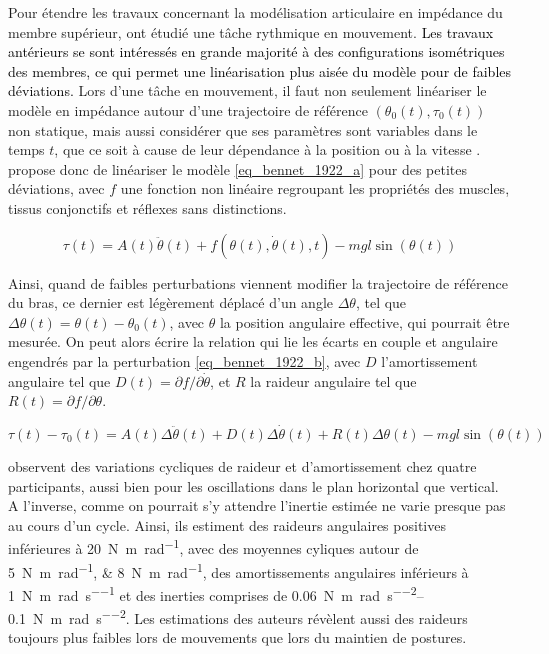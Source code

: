 Pour étendre les travaux concernant la modélisation articulaire en impédance du membre supérieur, \textcite{bennett_time-varying_1992} ont étudié une tâche rythmique en mouvement. \textcolor{black}{Les travaux antérieurs se sont intéressés en grande majorité à des configurations isométriques des membres, ce qui permet une linéarisation plus aisée du modèle pour de faibles déviations.} Lors d'une tâche en mouvement, il faut non seulement linéariser le modèle en impédance autour d'une trajectoire de référence $(\theta_0(t), \tau_0(t))$ non statique, mais aussi considérer que ses paramètres sont variables dans le temps $t$, que ce soit à cause de leur dépendance à la position ou à la vitesse \parencite{milner_dependence_1993, kuxhaus_dependence_2014}. \textcite{bennett_time-varying_1992} propose donc de linéariser le modèle \cref{eq_bennet_1922_a} pour des petites déviations, avec $f$ une fonction non linéaire regroupant les propriétés des muscles, tissus conjonctifs et réflexes sans distinctions.

\begin{equation} \label{eq_bennet_1922_a}
	\tau(t) = A(t)\ddot{\theta}(t) + f(\theta(t), \dot{\theta}(t), t) - mgl\sin(\theta(t))
\end{equation}

Ainsi, quand de faibles perturbations viennent modifier la trajectoire de référence du bras, ce dernier est légèrement déplacé d'un angle $\Delta\theta$, tel que $\Delta\theta(t) = \theta(t) - \theta_0(t)$, avec $\theta$ la position angulaire effective, qui pourrait être mesurée. On peut alors écrire la relation qui lie les écarts en couple et angulaire engendrés par la perturbation \cref{eq_bennet_1922_b}, avec $D$ l'amortissement angulaire tel que $D(t) = \partial f/\partial \dot{\theta}$, et $R$ la raideur angulaire tel que $R(t) = \partial f/\partial \theta$.

\begin{equation} \label{eq_bennet_1922_b}
	\tau(t) - \tau_0(t) = A(t)\Delta\ddot{\theta}(t) + D(t)\Delta\dot{\theta}(t) + R(t)\Delta\theta(t) - mgl\sin(\theta(t))
\end{equation}

\textcite{bennett_time-varying_1992} observent des variations cycliques de raideur et d'amortissement chez quatre participants, aussi bien pour les oscillations dans le plan horizontal que vertical. A l'inverse, comme on pourrait s'y attendre l'inertie estimée ne varie presque pas au cours d'un cycle. Ainsi, ils estiment des raideurs angulaires positives inférieures à \SI{20}{\newton\meter\per\radian}, avec des moyennes cyliques autour de \SIlist{5;8}{\newton\meter\per\radian}, des amortissements angulaires inférieurs à \SI{1}{\newton\meter\per\radian\per\second} et des inerties comprises de \SIrange{0.06}{0.1}{\newton\meter\per\radian\per\second\squared}. Les estimations des auteurs révèlent aussi des raideurs toujours plus faibles lors de mouvements que lors du maintien de postures.

